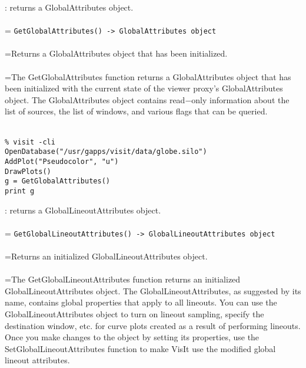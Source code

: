 \documentclass[10pt,a4paper]{report}
\begin{document}
{}
: returns a GlobalAttributes object.\\[-3mm]

 \\ 
\hangindent=\parindent 
\verb!GetGlobalAttributes() -> GlobalAttributes object!\\ [-3mm]

 \\ 
\hangindent=\parindent Returns a GlobalAttributes object that has been initialized. \\[-3mm] 

 \\ 
\hangindent=\parindent The GetGlobalAttributes function returns a GlobalAttributes object that has been initialized with the current state of the viewer proxy's GlobalAttributes object. The GlobalAttributes object contains read$-$only information about the list of sources, the list of windows, and various flags that can be queried. \\[-3mm] 

\\[-6mm]
\begin{verbatim}% visit -cli
OpenDatabase("/usr/gapps/visit/data/globe.silo")
AddPlot("Pseudocolor", "u")
DrawPlots()
g = GetGlobalAttributes()
print g
\end{verbatim}
\newpage


{}
: returns a GlobalLineoutAttributes object.\\[-3mm]

 \\ 
\hangindent=\parindent 
\verb!GetGlobalLineoutAttributes() -> GlobalLineoutAttributes object!\\ [-3mm]

 \\ 
\hangindent=\parindent Returns an initialized GlobalLineoutAttributes object. \\[-3mm] 

 \\ 
\hangindent=\parindent The GetGlobalLineoutAttributes function returns an initialized GlobalLineoutAttributes object. The GlobalLineoutAttributes, as suggested by its name, contains global properties that apply to all lineouts. You can use the GlobalLineoutAttributes object to turn on lineout sampling, specify the destination window, etc. for curve plots created as a result of performing lineouts. Once you make changes to the object by setting its properties, use the SetGlobalLineoutAttributes function to make VisIt use the modified global lineout attributes. \\[-3mm] 
\end{document}
